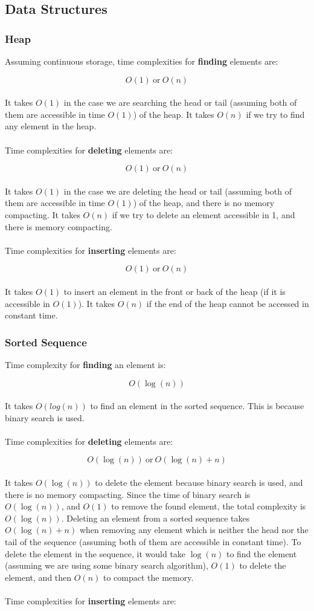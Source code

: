 \documentclass{article}
\begin{document}
\subsection{Data Structures}
\subsubsection{Heap}
Assuming continuous storage, time complexities for \textbf{finding} elements are:

\[ O(1)~\text{or}~O(n) \] \\
It takes $O(1)$ in the case we are searching the head or tail (assuming both of them are accessible in
time $O(1)$) of the heap. It takes $O(n)$ if we try to find any element in the heap. \\ \\
Time complexities for \textbf{deleting} elements are:

\[ O(1)~\text{or}~O(n) \] \\
It takes $O(1)$ in the case we are deleting the head or tail (assuming both of them are accessible in
time $O(1)$) of the heap, and there is no memory compacting. It takes $O(n)$ if we try to delete an element accessible in 1, and there is memory compacting. \\ \\
Time complexities for \textbf{inserting} elements are:

\[ O(1)~\text{or}~O(n) \] \\
It takes $O(1)$ to insert an element in the front or back of the heap (if it is accessible in $O(1)$). It takes $O(n)$ if the end of the heap cannot be accessed in constant time.

\subsubsection{Sorted Sequence}
Time complexity for \textbf{finding} an element is:

\[ O(\log(n)) \] \\
It takes $O(log(n))$ to find an element in the sorted sequence. This is because binary search is used. \\ \\
Time complexities for \textbf{deleting} elements are:

\[ O(\log(n))~\text{or}~O(\log(n) + n) \] \\
It takes $O(\log(n))$ to delete the element because binary search is used, and there is no memory compacting. Since the time of binary search is $O(\log(n))$, and $O(1)$ to remove the found element, the total complexity is $O(\log(n))$. Deleting an element from a sorted sequence takes $O(\log(n) + n)$ when removing any element which is neither the head nor the tail of the sequence (assuming both of them are accessible in constant time). To delete the element in the sequence, it would take $\log(n)$ to find the element (assuming we are using some binary search algorithm), $O(1)$ to delete the element, and then $O(n)$ to compact the memory. \\ \\
Time complexities for \textbf{inserting} elements are:
\end{document}
